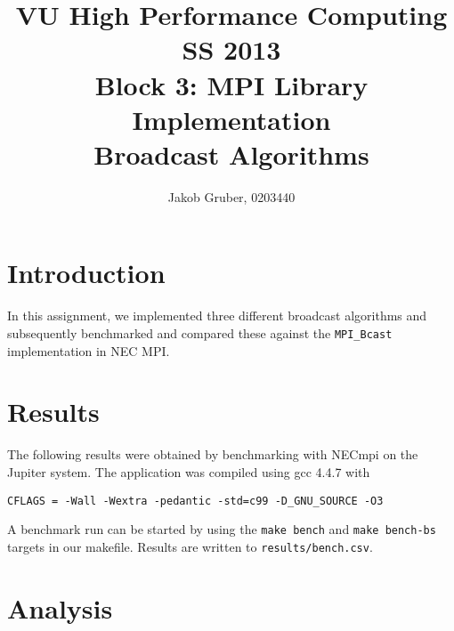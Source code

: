 \documentclass[a4paper,10pt]{article}
\title{VU High Performance Computing \\
       SS 2013 \\
       Block 3: MPI Library Implementation \\
       Broadcast Algorithms}
\author{Jakob Gruber, 0203440}
\begin{document}
\maketitle
\tableofcontents
\pagebreak

\section{Introduction} \label{section:introduction}

In this assignment, we implemented three different broadcast algorithms and
subsequently benchmarked and compared these against the \lstinline|MPI_Bcast|
implementation in NEC MPI.

\section{Results}

The following results were obtained by benchmarking with NECmpi on the Jupiter system. The
application was compiled using gcc 4.4.7 with

\begin{verbatim}
CFLAGS = -Wall -Wextra -pedantic -std=c99 -D_GNU_SOURCE -O3
\end{verbatim}

A benchmark run can be started by using the \verb|make bench| and \verb|make bench-bs|
targets in our makefile. Results are written to \verb|results/bench.csv|.

\begin{comment}
TODO: "Estimate best block size using measured alpha and beta"??
TODO: "Verify/falsify claims of lecture"
TODO: "Estimate parameter ranges (processes, data sizes) for which algorithms are ideal.
TODO: Random communicator??
TODO: How to avoid performance problems (random communicators), which means MPI provides (NONE?)
Show graphs.
Briefly describe algorithms.
Best block sizes for linear/binary.
\end{comment}


\section{Analysis}
\end{document}
